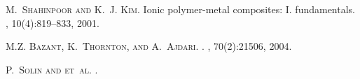 
\begin{thebibliography}{10}
\textsc{M.~Shahinpoor and K.~J. Kim.}
\newblock Ionic polymer-metal composites: I. fundamentals.
, 10(4):819--833, 2001.

\textsc{M.Z. Bazant, K.~Thornton, and A.~Ajdari.}
.
, 70(2):21506, 2004.

\textsc{P.~Solin and et~al.}
.
\end{thebibliography}